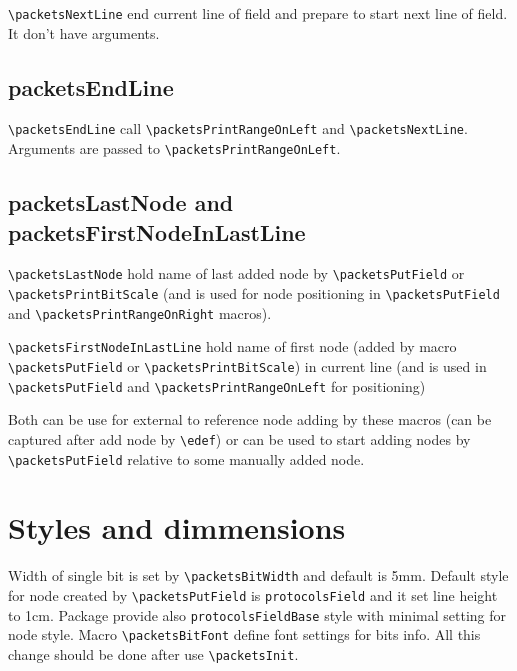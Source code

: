\documentclass[a4paper]{article}
\begin{document}
\Verb$\packetsNextLine$ end current line of field and prepare to start next line of field. It don't have arguments.

\subsection{packetsEndLine}

\Verb$\packetsEndLine$ call \Verb$\packetsPrintRangeOnLeft$ and \Verb$\packetsNextLine$.
Arguments are passed to \Verb$\packetsPrintRangeOnLeft$.

\subsection{packetsLastNode and packetsFirstNodeInLastLine}

\Verb$\packetsLastNode$ hold name of last added node by \Verb$\packetsPutField$ or \Verb$\packetsPrintBitScale$ (and is used for node positioning in \Verb$\packetsPutField$ and \Verb$\packetsPrintRangeOnRight$ macros).

\Verb$\packetsFirstNodeInLastLine$ hold name of first node (added by macro \Verb$\packetsPutField$ or \Verb$\packetsPrintBitScale$) in current line (and is used in \Verb$\packetsPutField$ and \Verb$\packetsPrintRangeOnLeft$ for positioning)

Both can be use for external to reference node adding by these macros (can be captured after add node by \Verb$\edef$) or can be used to start adding nodes by \Verb$\packetsPutField$ relative to some manually added node.

\begin{CenterExample}
\end{CenterExample}

\section{Styles and dimmensions}

Width of single bit is set by \Verb$\packetsBitWidth$ and default is 5mm. Default style for node created by \Verb$\packetsPutField$ is \Verb$protocolsField$ and it set line height to 1cm.
Package provide also \Verb$protocolsFieldBase$ style with minimal setting for node style.
Macro \Verb$\packetsBitFont$ define font settings for bits info.
All this change should be done after use \Verb$\packetsInit$.
\end{document}
